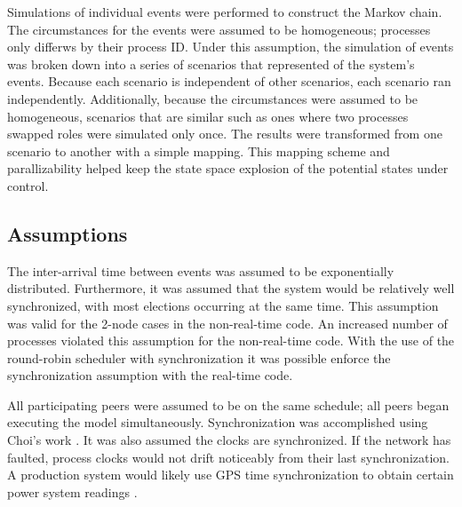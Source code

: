 Simulations of individual events were performed to construct the Markov chain.
The circumstances for the events were assumed to be homogeneous; processes only differws by their process ID.
Under this assumption, the simulation of events was broken down into a series of scenarios that represented of the system's events.
Because each scenario is independent of other scenarios, each scenario ran independently.
Additionally, because the circumstances were assumed to be homogeneous, scenarios that are similar such as ones where two processes swapped roles were simulated only once. 
The results were transformed from one scenario to another with a simple mapping.
This mapping scheme and parallizability helped keep the state space explosion of the potential states under control.

\subsection{Assumptions}

The inter-arrival time between events was assumed to be exponentially distributed.
Furthermore, it was assumed that the system would be relatively well synchronized, with most elections occurring at the same time.
This assumption was valid for the 2-node cases in the non-real-time code. 
An increased number of processes violated this assumption for the non-real-time code.
With the use of the round-robin scheduler with synchronization it was possible enforce the synchronization assumption with the real-time code.

All participating peers were assumed to be on the same schedule; all peers began executing the model simultaneously.
Synchronization was accomplished using Choi's work \cite{DCS}.
It was also assumed the clocks are synchronized. 
If the network has faulted, process clocks would not drift noticeably from their last synchronization.
A production system would likely use GPS time synchronization to obtain certain power system readings \cite{PHASORREADINGS}.
